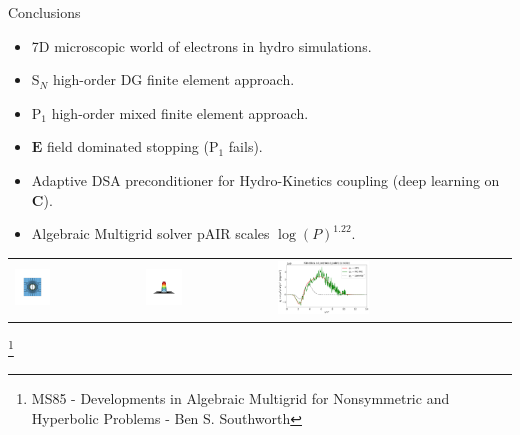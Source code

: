 \documentclass[8pt, compress]{beamer}
\newcommand{\vect}[1]{\boldsymbol{#1}}
\newcommand{\matr}[1]{\mathbf{#1}}
\newcommand{\E}{\vect{E}}
\begin{document}
\begin{frame}
\begin{center}
{\huge Conclusions}
\begin{itemize}
  \item 7D microscopic world of electrons in hydro simulations.
  \item S$_N$ high-order DG finite element approach.
  \item P$_1$ high-order mixed finite element approach.
  \item $\E$ field dominated stopping (P$_1$ fails).
  \item Adaptive DSA preconditioner for Hydro-Kinetics coupling (deep learning on $\matr{C}$).
  \item Algebraic Multigrid solver pAIR scales $\log(P)^{1.22}$.
\end{itemize}
\begin{tabular}{lll}
\includegraphics[width=0.3\textwidth]{../figures/AMR_ALE_density_2D_nobar.png} &
\includegraphics[width=0.3\textwidth]{../figures/AMR_ALE_nonlocal_Te_3D_nobar.png} &
\includegraphics[width=0.4\textwidth]{../figures/C7_Calder_case5_nonlocal_kinetics_noSNB.png}
\end{tabular}
\let\thefootnote\relax\footnote{MS85 - Developments in Algebraic Multigrid for Nonsymmetric and Hyperbolic Problems - Ben S. Southworth}

\end{center}
\end{frame}
\end{document}

